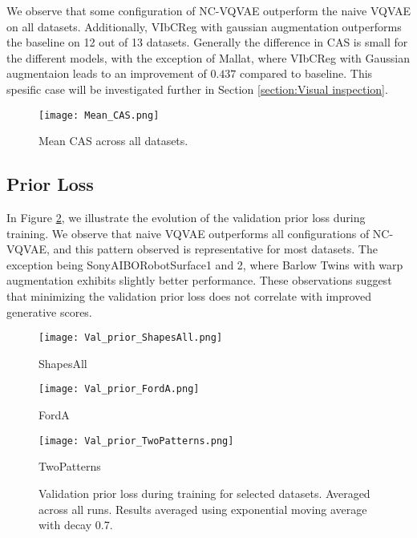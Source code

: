 \documentclass[../../thesis.tex]{subfiles}
\begin{document}
We observe that some configuration of NC-VQVAE outperform the naive VQVAE on all datasets. Additionally, VIbCReg with gaussian augmentation outperforms the baseline on 12 out of 13 datasets. Generally the difference in CAS is small for the different models, with the exception of Mallat, where VIbCReg with Gaussian augmentaion leads to an improvement of $0.437$ compared to baseline. This spesific case will be investigated further in Section \ref{section:Visual inspection}.

\begin{figure}[h]
    \texttt{[image: Mean\_CAS.png]}
    \centering  
    \caption{Mean CAS across all datasets.}
    \label{fig:Mean_CAS}
\end{figure}


\subsection{Prior Loss}

In Figure \ref{fig:val_prior}, we illustrate the evolution of the validation prior loss during training. We observe that naive VQVAE outperforms all configurations of NC-VQVAE, and this pattern observed is representative for most datasets. The exception being SonyAIBORobotSurface1 and 2, where Barlow Twins with warp augmentation exhibits slightly better performance. These observations suggest that minimizing the validation prior loss does not correlate with improved generative scores.


\begin{figure}[h]
    \centering
    \begin{minipage}[b]{0.32\textwidth}
        \centering
        \texttt{[image: Val\_prior\_ShapesAll.png]}
        \caption*{ShapesAll}
    \end{minipage}
    \begin{minipage}[b]{0.32\textwidth}
        \centering
        \texttt{[image: Val\_prior\_FordA.png]}
        \caption*{FordA}
    \end{minipage}
    \begin{minipage}[b]{0.32\textwidth}
        \centering
        \texttt{[image: Val\_prior\_TwoPatterns.png]}
        \caption*{TwoPatterns}
    \end{minipage}
    \caption{Validation prior loss during training for selected datasets. Averaged across all runs. Results averaged using exponential moving average with decay 0.7.}
    \label{fig:val_prior}
\end{figure}
\end{document}

